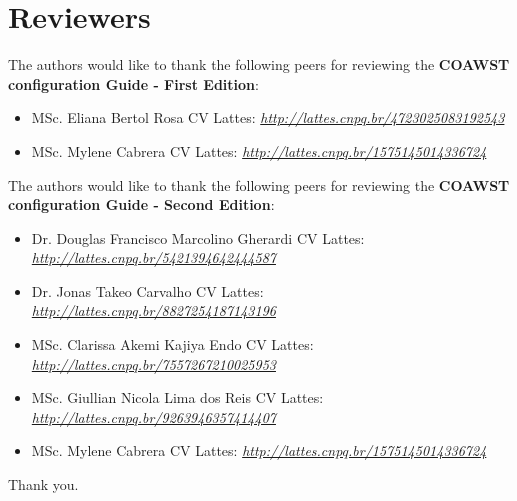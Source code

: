 \chapter*{Reviewers}

\bigskip
\noindent The authors would like to thank the following peers for reviewing the \textbf{COAWST configuration Guide - First Edition}:
\bigskip

\begin{itemize}
    \item MSc. Eliana Bertol Rosa \newline CV Lattes: \textit{\textcolor{bleu_cite}{\href{http://lattes.cnpq.br/4723025083192543}{http://lattes.cnpq.br/4723025083192543}}}
    \bigskip
    \item MSc. Mylene Cabrera \newline CV Lattes: \textit{\textcolor{bleu_cite}{\href{http://lattes.cnpq.br/1575145014336724}{http://lattes.cnpq.br/1575145014336724}}}
\end{itemize}

\bigskip
\bigskip
\noindent The authors would like to thank the following peers for reviewing the \textbf{COAWST configuration Guide - Second Edition}:
\bigskip

\begin{itemize}
    \item Dr. Douglas Francisco Marcolino Gherardi \newline CV Lattes: \textit{\textcolor{bleu_cite}{\href{http://lattes.cnpq.br/5421394642444587}{http://lattes.cnpq.br/5421394642444587}}}
    \bigskip
    \item Dr. Jonas Takeo Carvalho \newline CV Lattes: \textit{\textcolor{bleu_cite}{\href{http://lattes.cnpq.br/8827254187143196}{http://lattes.cnpq.br/8827254187143196}}}
    \bigskip
    \item MSc. Clarissa Akemi Kajiya Endo \newline CV Lattes: \textit{\textcolor{bleu_cite}{\href{http://lattes.cnpq.br/7557267210025953}{http://lattes.cnpq.br/7557267210025953}}}
    \bigskip
    \item MSc. Giullian Nicola Lima dos Reis \newline CV Lattes: \textit{\textcolor{bleu_cite}{\href{http://lattes.cnpq.br/9263946357414407}{http://lattes.cnpq.br/9263946357414407}}}
    \bigskip
    \item MSc. Mylene Cabrera \newline CV Lattes: \textit{\textcolor{bleu_cite}{\href{http://lattes.cnpq.br/1575145014336724}{http://lattes.cnpq.br/1575145014336724}}}
\end{itemize}
\bigskip
    Thank you. \\

